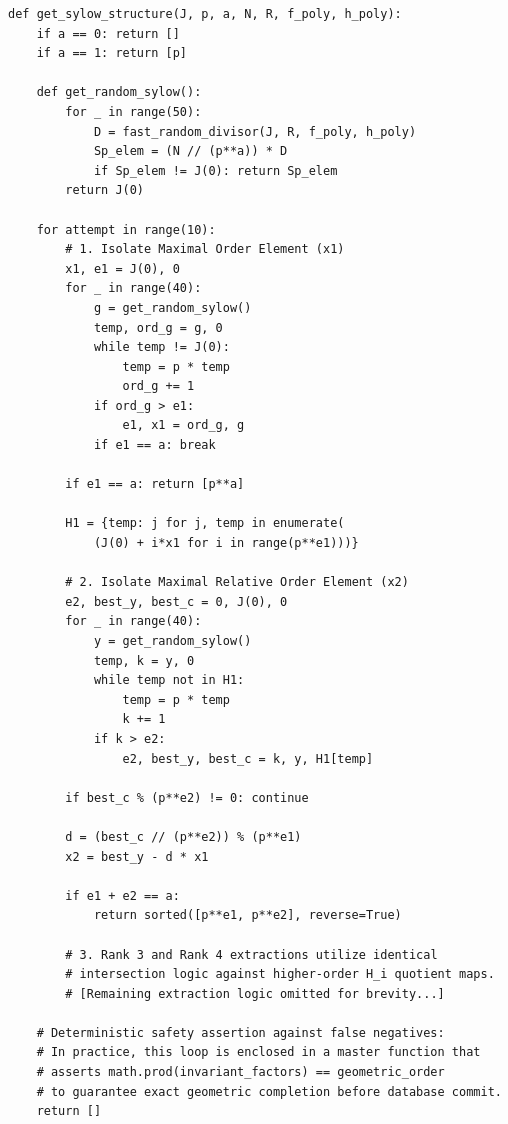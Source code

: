 \documentclass[letterpaper, 11pt]{article}
\begin{document}
\begin{lstlisting}
def get_sylow_structure(J, p, a, N, R, f_poly, h_poly):
    if a == 0: return []
    if a == 1: return [p]
    
    def get_random_sylow():
        for _ in range(50):
            D = fast_random_divisor(J, R, f_poly, h_poly)
            Sp_elem = (N // (p**a)) * D
            if Sp_elem != J(0): return Sp_elem
        return J(0)
        
    for attempt in range(10): 
        # 1. Isolate Maximal Order Element (x1)
        x1, e1 = J(0), 0
        for _ in range(40):
            g = get_random_sylow()
            temp, ord_g = g, 0
            while temp != J(0):
                temp = p * temp
                ord_g += 1
            if ord_g > e1:
                e1, x1 = ord_g, g
            if e1 == a: break
        
        if e1 == a: return [p**a]
        
        H1 = {temp: j for j, temp in enumerate(
            (J(0) + i*x1 for i in range(p**e1)))}
            
        # 2. Isolate Maximal Relative Order Element (x2)
        e2, best_y, best_c = 0, J(0), 0
        for _ in range(40):
            y = get_random_sylow()
            temp, k = y, 0
            while temp not in H1:
                temp = p * temp
                k += 1
            if k > e2:
                e2, best_y, best_c = k, y, H1[temp]
                
        if best_c % (p**e2) != 0: continue 
            
        d = (best_c // (p**e2)) % (p**e1)
        x2 = best_y - d * x1
        
        if e1 + e2 == a:
            return sorted([p**e1, p**e2], reverse=True)
            
        # 3. Rank 3 and Rank 4 extractions utilize identical 
        # intersection logic against higher-order H_i quotient maps.
        # [Remaining extraction logic omitted for brevity...]
        
    # Deterministic safety assertion against false negatives:
    # In practice, this loop is enclosed in a master function that 
    # asserts math.prod(invariant_factors) == geometric_order
    # to guarantee exact geometric completion before database commit.
    return []
\end{lstlisting}
\end{document}
